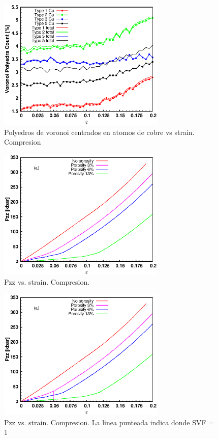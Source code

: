 \documentclass[10pt, oneside]{article} %
\begin{document}
\begin{figure}[H]
\centering
\includegraphics[width=8cm]{Figures/Porosidad/porosity_cu_strain.eps}
\caption{Polyedros de voronoi centrados en atomos de cobre vs strain. Compresion}
\end{figure}

\begin{figure}[H]
\centering
\includegraphics[width=8cm]{Figures/Porosidad/porosity_Pzz_strain_comp.eps}
\caption{Pzz vs. strain. Compresion.}
\end{figure}

\begin{figure}[H]
\centering
\includegraphics[width=8cm]{Figures/Porosidad/porosity_Pzz_strain_comp_dash.eps}
\caption{Pzz vs. strain. Compresion. La linea punteada indica donde SVF = 1}
\end{figure}
\end{document}
